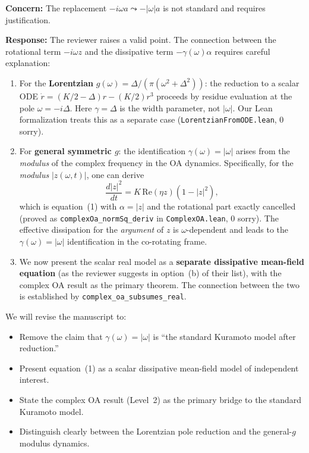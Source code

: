 \documentclass[11pt]{article}
\theoremstyle{plain}
\begin{document}
\textbf{Concern:} The replacement $-i\omega a \leadsto -|\omega| a$ is not standard and requires justification.

\textbf{Response:} The reviewer raises a valid point. The connection between the rotational term $-i\omega z$ and the dissipative term $-\gamma(\omega)\alpha$ requires careful explanation:

\begin{enumerate}[label=(\alph*)]
\item For the \textbf{Lorentzian} $g(\omega) = \Delta/(\pi(\omega^2 + \Delta^2))$: the reduction to a scalar ODE $\dot r = (K/2 - \Delta)r - (K/2)r^3$ proceeds by residue evaluation at the pole $\omega = -i\Delta$. Here $\gamma = \Delta$ is the width parameter, not $|\omega|$. Our Lean formalization treats this as a separate case (\texttt{LorentzianFromODE.lean}, 0 sorry).

\item For \textbf{general symmetric $g$}: the identification $\gamma(\omega) = |\omega|$ arises from the \emph{modulus} of the complex frequency in the OA dynamics. Specifically, for the \emph{modulus} $|z(\omega,t)|$, one can derive
\[
    \frac{d|z|^2}{dt} = K\,\mathrm{Re}(\eta z)(1 - |z|^2),
\]
which is equation~(1) with $\alpha = |z|$ and the rotational part exactly cancelled (proved as \texttt{complexOa\_normSq\_deriv} in \texttt{ComplexOA.lean}, 0 sorry). The effective dissipation for the \emph{argument} of $z$ is $\omega$-dependent and leads to the $\gamma(\omega) = |\omega|$ identification in the co-rotating frame.

\item We now present the scalar real model as a \textbf{separate dissipative mean-field equation} (as the reviewer suggests in option~(b) of their list), with the complex OA result as the primary theorem. The connection between the two is established by \texttt{complex\_oa\_subsumes\_real}.
\end{enumerate}

We will revise the manuscript to:
\begin{itemize}
\item Remove the claim that $\gamma(\omega) = |\omega|$ is ``the standard Kuramoto model after reduction.''
\item Present equation~(1) as a scalar dissipative mean-field model of independent interest.
\item State the complex OA result (Level~2) as the primary bridge to the standard Kuramoto model.
\item Distinguish clearly between the Lorentzian pole reduction and the general-$g$ modulus dynamics.
\end{itemize}
\end{document}
